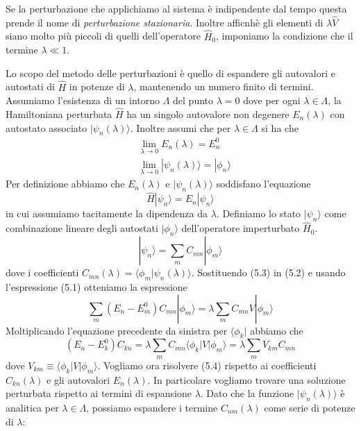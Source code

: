 Se la perturbazione che applichiamo al sistema \`e indipendente dal tempo questa prende il nome di \textit{perturbazione stazionaria}. Inoltre afficnh\`e gli elementi di $\lambda \hat{V}$ siano molto pi\`u piccoli di quelli dell'operatore $\hat{H}_0$, imponiamo la condizione che il termine $\lambda \ll 1$.

Lo scopo del metodo delle perturbazioni \`e quello di espandere gli autovalori e autostati di $\hat{H}$ in potenze di $\lambda$, mantenendo un numero finito di termini. Assumiamo l'esistenza di un intorno $\Lambda$ del punto $\lambda = 0$ dove per ogni $\lambda \in \Lambda$, la Hamiltoniana perturbata $\hat{H}$ ha un singolo autovalore non degenere $E_n(\lambda)$ con autostato associato $|\psi_n(\lambda) \rangle $. Inoltre assumi che per $\lambda \in \Lambda$ si ha che 
\begin{align*}
	& \lim_{\lambda \to 0}E_n(\lambda) = E_n^0 \\[0.5cm]
	& \lim_{\lambda \to 0} |\psi_{n}(\lambda) \rangle = |\phi_n \rangle 
\end{align*}
Per definizione abbiamo che $E_{n}(\lambda)$ e $|\psi_n(\lambda)\rangle$ soddisfano l'equazione 
\begin{equation}
	\hat{H}|\psi_n \rangle = E_n |\psi_n \rangle 
\end{equation}
in cui assumiamo tacitamente la dipendenza da $\lambda$. Definiamo lo stato $|\psi_n \rangle$ come combinazione lineare degli autostati $|\phi_n \rangle$ dell'operatore imperturbato $\hat{H}_0$.
\begin{equation}
	|\psi_n \rangle = \sum_{m} C_{mn}|\phi_m \rangle 
\end{equation} 
dove i coefficienti $C_{mn}(\lambda) = \langle \phi_m| \psi_n (\lambda) \rangle $. Sostituendo (5.3) in (5.2) e usando l'espressione (5.1) otteniamo la espressione
\begin{equation*}
	\sum_{m} (E_n - E_m^0)C_{mn}|\phi_{m} \rangle = \lambda \sum_{m} C_{mn}V|\phi_m \rangle 
\end{equation*} 
Moltiplicando l'equazione precedente da sinistra per $\langle \phi_k |$ abbiamo che
\begin{equation}
	(E_n - E_k^0) C_{kn} = \lambda \sum_{m} C_{mn} \langle \phi_k|V|\phi_m \rangle  = \lambda \sum_{m}V_{km}C_{mn}
\end{equation} 
dove $V_{km} \equiv \langle \phi_k|V|\phi_m \rangle $. Vogliamo ora risolvere (5.4) rispetto ai coefficienti $C_{kn}(\lambda)$ e gli autovalori $E_{n}(\lambda)$. In particolare vogliamo trovare una soluzione perturbata rispetto ai termini di espansione $\lambda$. Dato che la funzione $| \psi_n(\lambda) \rangle $ \`e analitica per $\lambda \in \Lambda$, possiamo espandere i termine $C_{nm}(\lambda)$ come serie di potenze di $\lambda$:

